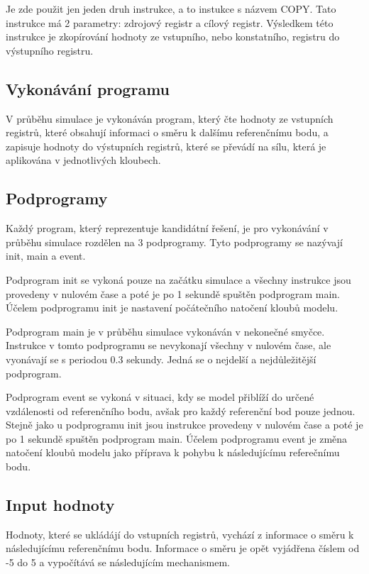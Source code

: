 Je zde použit jen jeden druh instrukce, a to instukce s názvem COPY.
Tato instrukce má 2 parametry: zdrojový registr a cílový registr.
Výsledkem této instrukce je zkopírování hodnoty ze vstupního, nebo konstatního, registru do výstupního registru.

\subsection{Vykonávání programu}

V průběhu simulace je vykonáván program, který čte hodnoty ze vstupních registrů, které obsahují informaci o směru k dalšímu referenčnímu bodu, a zapisuje hodnoty do výstupních registrů, které se převádí na sílu, která je aplikována v jednotlivých kloubech.

\subsection{Podprogramy}

Každý program, který reprezentuje kandidátní řešení, je pro vykonávání v průběhu simulace rozdělen na 3 podprogramy.
Tyto podprogramy se nazývají init, main a event.

Podprogram init se vykoná pouze na začátku simulace a všechny instrukce jsou provedeny v nulovém čase a poté je po 1 sekundě spuštěn podprogram main.
Účelem podprogramu init je nastavení počátečního natočení kloubů modelu.

Podprogram main je v průběhu simulace vykonáván v nekonečné smyčce.
Instrukce v tomto podprogramu se nevykonají všechny v nulovém čase, ale vyonávají se s periodou 0.3 sekundy.
Jedná se o nejdelší a nejdůležitější podprogram.

Podprogram event se vykoná v situaci, kdy se model přiblíží do určené vzdálenosti od referenčního bodu, avšak pro každý referenční bod pouze jednou.
Stejně jako u podprogramu init jsou instrukce provedeny v nulovém čase a poté je po 1 sekundě spuštěn podprogram main.
Účelem podprogramu event je změna natočení kloubů modelu jako příprava k pohybu k následujícímu referečnímu bodu.

\subsection{Input hodnoty}

Hodnoty, které se ukládájí do vstupních registrů, vychází z informace o směru k následujícímu referenčnímu bodu.
Informace o směru je opět vyjádřena číslem od -5 do 5 a vypočítává se následujícím mechanismem.


